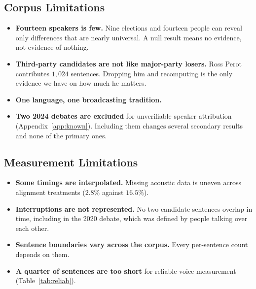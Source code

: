 \documentclass[pdflatex,sn-mathphys-num]{sn-jnl}%
\begin{document}
\subsection{Corpus Limitations}
\begin{itemize}\itemsep2pt
  \item \textbf{Fourteen speakers is few.} Nine elections and fourteen
        people can reveal only differences that are nearly universal. A
        null result means no evidence, not evidence of nothing.
  \item \textbf{Third-party candidates are not like major-party losers.}
        Ross Perot contributes $1{,}024$ sentences. Dropping him and
        recomputing is the only evidence we have on how much he matters.
  \item \textbf{One language, one broadcasting tradition.}
  \item \textbf{Two 2024 debates are excluded} for unverifiable speaker
        attribution (Appendix~\ref{app:known}). Including them changes
        several secondary results and none of the primary ones.
\end{itemize}

\subsection{Measurement Limitations}
\begin{itemize}\itemsep2pt
  \item \textbf{Some timings are interpolated.} Missing acoustic data
        is uneven across alignment treatments ($2.8\%$ against $16.5\%$).
  \item \textbf{Interruptions are not represented.} No two candidate
        sentences overlap in time, including in the 2020 debate, which was
        defined by people talking over each other.
  \item \textbf{Sentence boundaries vary across the corpus.} Every
        per-sentence count depends on them.
  \item \textbf{A quarter of sentences are too short} for reliable voice
        measurement (Table~\ref{tab:reliab}).
\end{itemize}
\end{document}
